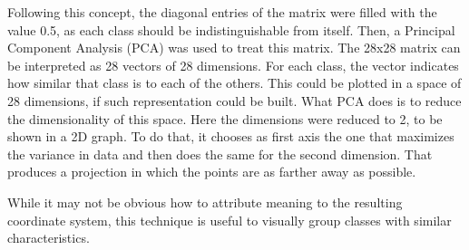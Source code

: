 Following this concept, the diagonal entries of the matrix were filled with the value 0.5, as each class should be indistinguishable from itself. Then, a Principal Component Analysis (PCA) \cite{amirani_new_2008} was used to treat this matrix. The 28x28 matrix can be interpreted as 28 vectors of 28 dimensions. For each class, the vector indicates how similar that class is to each of the others. This could be plotted in a space of 28 dimensions, if such representation could be built. What PCA does is to reduce the dimensionality of this space. Here the dimensions were reduced to 2, to be shown in a 2D graph. To do that, it chooses as first axis the one that maximizes the variance in data and then does the same for the second dimension. That produces a projection in which the points are as farther away as possible.

While it may not be obvious how to attribute meaning to the resulting coordinate system, this technique is useful to visually group classes with similar characteristics.

